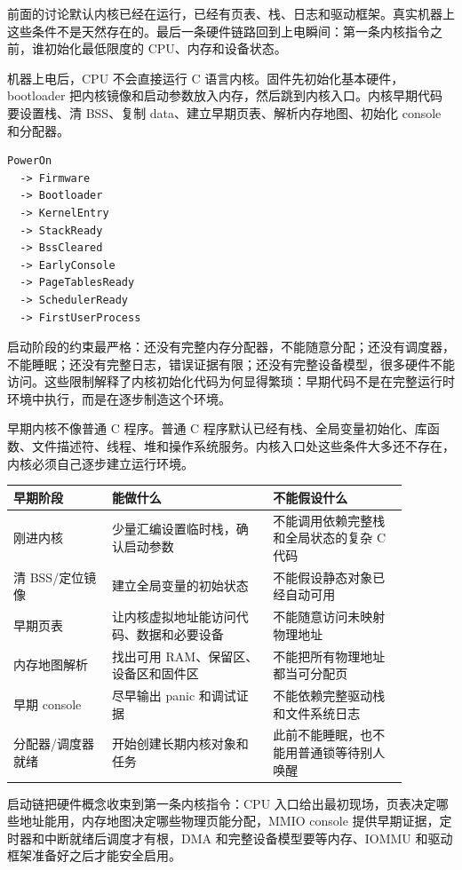 前面的讨论默认内核已经在运行，已经有页表、栈、日志和驱动框架。真实机器上这些条件不是天然存在的。最后一条硬件链路回到上电瞬间：第一条内核指令之前，谁初始化最低限度的 CPU、内存和设备状态。

机器上电后，CPU 不会直接运行 C 语言内核。固件先初始化基本硬件，bootloader 把内核镜像和启动参数放入内存，然后跳到内核入口。内核早期代码要设置栈、清 BSS、复制 data、建立早期页表、解析内存地图、初始化 console 和分配器。

\begin{lstlisting}
PowerOn
  -> Firmware
  -> Bootloader
  -> KernelEntry
  -> StackReady
  -> BssCleared
  -> EarlyConsole
  -> PageTablesReady
  -> SchedulerReady
  -> FirstUserProcess
\end{lstlisting}

启动阶段的约束最严格：还没有完整内存分配器，不能随意分配；还没有调度器，不能睡眠；还没有完整日志，错误证据有限；还没有完整设备模型，很多硬件不能访问。这些限制解释了内核初始化代码为何显得繁琐：早期代码不是在完整运行时环境中执行，而是在逐步制造这个环境。

早期内核不像普通 C 程序。普通 C 程序默认已经有栈、全局变量初始化、库函数、文件描述符、线程、堆和操作系统服务。内核入口处这些条件大多还不存在，内核必须自己逐步建立运行环境。

\begin{longtable}{p{0.22\linewidth}p{0.36\linewidth}p{0.3\linewidth}}
\toprule
早期阶段 & 能做什么 & 不能假设什么 \\
\midrule
刚进内核 & 少量汇编设置临时栈，确认启动参数 & 不能调用依赖完整栈和全局状态的复杂 C 代码 \\
清 BSS/定位镜像 & 建立全局变量的初始状态 & 不能假设静态对象已经自动可用 \\
早期页表 & 让内核虚拟地址能访问代码、数据和必要设备 & 不能随意访问未映射物理地址 \\
内存地图解析 & 找出可用 RAM、保留区、设备区和固件区 & 不能把所有物理地址都当可分配页 \\
早期 console & 尽早输出 panic 和调试证据 & 不能依赖完整驱动栈和文件系统日志 \\
分配器/调度器就绪 & 开始创建长期内核对象和任务 & 此前不能睡眠，也不能用普通锁等待别人唤醒 \\
\bottomrule
\end{longtable}

启动链把硬件概念收束到第一条内核指令：CPU 入口给出最初现场，页表决定哪些地址能用，内存地图决定哪些物理页能分配，MMIO console 提供早期证据，定时器和中断就绪后调度才有根，DMA 和完整设备模型要等内存、IOMMU 和驱动框架准备好之后才能安全启用。

